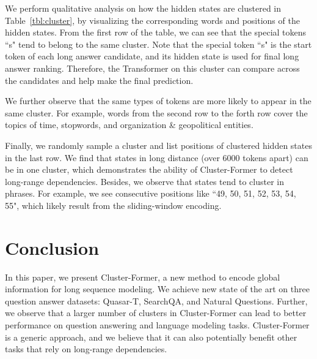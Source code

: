 \documentclass[11pt,a4paper]{article}
\begin{document}
We perform qualitative analysis on how the hidden states are clustered in Table~\ref{tbl:cluster},
by visualizing the corresponding words and positions of the hidden states.
From the first row of the table, we can see that the special tokens ``s" tend to belong to the same cluster. 
Note that the special token ``s" is the start token of each long answer candidate, and its hidden state is used for final long answer ranking.
Therefore, the Transformer on this cluster can compare across the candidates and help make the final prediction.

We further observe that the same types of tokens are more likely to appear in the same cluster. 
For example, words from the second row to the forth row cover the topics of time, stopwords, and organization \& geopolitical entities.

Finally, we randomly sample a cluster and list positions of clustered hidden states in the last row. 
We find that states in long distance (over 6000 tokens apart) can be in one cluster, which demonstrates the ability of Cluster-Former to detect long-range dependencies. Besides, we observe that states tend to cluster in phrases. 
For example, we see consecutive positions like ``49, 50, 51, 52, 53, 54, 55", which likely result from the sliding-window encoding. 
\section{Conclusion}
In this paper, we present Cluster-Former, a new method to encode global information for long sequence modeling. 
We achieve new state of the art on three question answer datasets: Quasar-T, SearchQA, and Natural Questions.
Further, we observe that a larger number of clusters in Cluster-Former can lead to better performance on question answering and language modeling tasks. Cluster-Former is a generic approach, and we believe that it can also potentially benefit other tasks that rely on long-range dependencies.


\end{document}
